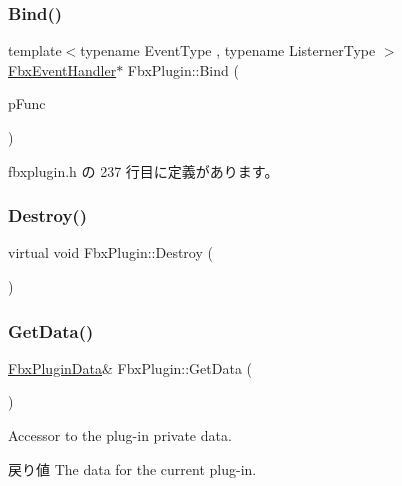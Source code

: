 \subsubsection{\texorpdfstring{Bind()}{Bind()}}
{\footnotesize\ttfamily template$<$typename Event\+Type , typename Listerner\+Type $>$ \\
\hyperlink{class_fbx_event_handler}{Fbx\+Event\+Handler}$\ast$ Fbx\+Plugin\+::\+Bind (\begin{DoxyParamCaption}\item[{void(Listerner\+Type\+::$\ast$)(const Event\+Type $\ast$)}]{p\+Func }\end{DoxyParamCaption})\hspace{0.3cm}{\ttfamily [inline]}}



 fbxplugin.\+h の 237 行目に定義があります。

\mbox{\label{class_fbx_plugin_a0a3b33c932cc862e539cef85d168b86a}} 
\subsubsection{\texorpdfstring{Destroy()}{Destroy()}}
{\footnotesize\ttfamily virtual void Fbx\+Plugin\+::\+Destroy (\begin{DoxyParamCaption}{ }\end{DoxyParamCaption})\hspace{0.3cm}{\ttfamily [pure virtual]}}

\mbox{\label{class_fbx_plugin_a2bcee62f35bb9ccaf60dddaa2bd42ed9}} 
\subsubsection{\texorpdfstring{Get\+Data()}{GetData()}\hspace{0.1cm}{\footnotesize\ttfamily [1/2]}}
{\footnotesize\ttfamily \hyperlink{struct_fbx_plugin_data}{Fbx\+Plugin\+Data}\& Fbx\+Plugin\+::\+Get\+Data (\begin{DoxyParamCaption}{ }\end{DoxyParamCaption})\hspace{0.3cm}{\ttfamily [protected]}}

Accessor to the plug-\/in private data. \begin{DoxyReturn}{戻り値}
The data for the current plug-\/in. 
\end{DoxyReturn}
\mbox{\label{class_fbx_plugin_aa35c615aa2b4b740ae01e6301503c844}} 
